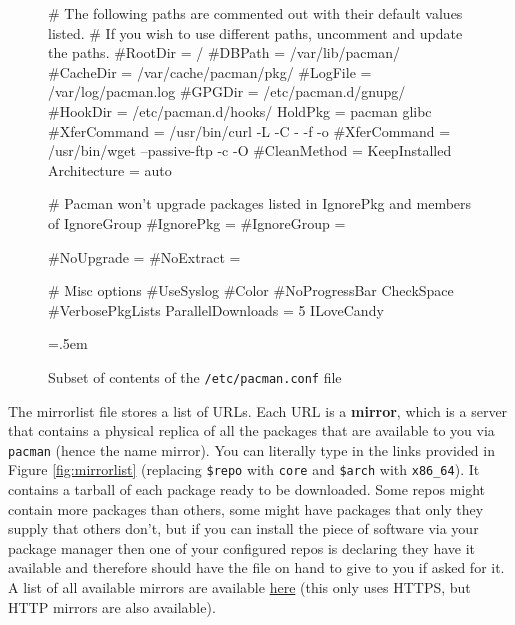 \documentclass{article}
\newenvironment{cverbatim}
    {\SaveVerbatim{cverb}}
    {\endSaveVerbatim
    \flushleft\fboxrule=0pt\fboxsep=.5em
    \colorbox{cverbbg}{%
      \makebox[\dimexpr\linewidth-2\fboxsep][l]{\BUseVerbatim{cverb}}%
    }
    \endflushleft
  }
\begin{document}
    \begin{figure}
      \begin{cverbatim} 
        # The following paths are commented out with their default values listed.
        # If you wish to use different paths, uncomment and update the paths.
        #RootDir     = /
        #DBPath      = /var/lib/pacman/
        #CacheDir    = /var/cache/pacman/pkg/
        #LogFile     = /var/log/pacman.log
        #GPGDir      = /etc/pacman.d/gnupg/
        #HookDir     = /etc/pacman.d/hooks/
        HoldPkg     = pacman glibc
        #XferCommand = /usr/bin/curl -L -C - -f -o %
        #XferCommand = /usr/bin/wget --passive-ftp -c -O %
        #CleanMethod = KeepInstalled
        Architecture = auto

        # Pacman won't upgrade packages listed in IgnorePkg and members of IgnoreGroup
        #IgnorePkg   =
        #IgnoreGroup =

        #NoUpgrade   =
        #NoExtract   =

        # Misc options
        #UseSyslog
        #Color
        #NoProgressBar
        CheckSpace
        #VerbosePkgLists
        ParallelDownloads = 5
        ILoveCandy

      \end{cverbatim}
      \caption{Subset of contents of the \texttt{/etc/pacman.conf} file} \label{fig:pacman.conf}
    \end{figure}
    
    The mirrorlist file stores a list of URLs. Each URL is a \textbf{mirror}, which is a server that contains a physical replica of all the packages that are available to you via \texttt{pacman} (hence the name mirror). You can literally type in the links provided in Figure \ref{fig:mirrorlist} (replacing \texttt{\$repo} with \texttt{core} and \texttt{\$arch} with \texttt{x86\_64}). It contains a tarball of each package ready to be downloaded. Some repos might contain more packages than others, some might have packages that only they supply that others don’t, but if you can install the piece of software via your package manager then one of your configured repos is declaring they have it available and therefore should have the file on hand to give to you if asked for it. A list of all available mirrors are available \href{https://archlinux.org/mirrorlist/all/https/}{here} (this only uses HTTPS, but HTTP mirrors are also available).  
\end{document}
